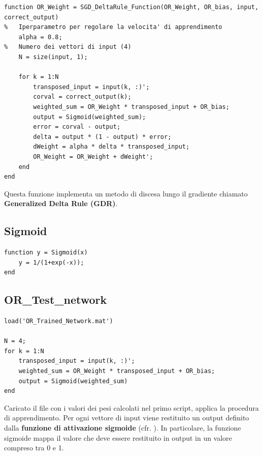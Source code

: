 \documentclass[a4paper,11pt]{article}
\begin{document}
\begin{lstlisting}[style=Matlab-editor,title=\texttt{SGD\_DeltaRule\_Function.mat}]
function OR_Weight = SGD_DeltaRule_Function(OR_Weight, OR_bias, input, correct_output)
%   Iperparametro per regolare la velocita' di apprendimento
    alpha = 0.8;
%   Numero dei vettori di input (4)
    N = size(input, 1);

    for k = 1:N 
        transposed_input = input(k, :)';
        corval = correct_output(k);
        weighted_sum = OR_Weight * transposed_input + OR_bias;
        output = Sigmoid(weighted_sum);
        error = corval - output;
        delta = output * (1 - output) * error;
        dWeight = alpha * delta * transposed_input;
        OR_Weight = OR_Weight + dWeight';
    end	
end
\end{lstlisting}
Questa funzione implementa un metodo di discesa lungo il gradiente chiamato \textbf{Generalized Delta Rule (GDR)}.


\subsection{Sigmoid}\label{sig}

\begin{lstlisting}[style=Matlab-editor,title=\texttt{Sigmoid.mat}]
function y = Sigmoid(x)
    y = 1/(1+exp(-x));
end
\end{lstlisting}


\subsection{OR\_Test\_network}

\begin{lstlisting}[style=Matlab-editor,title=\texttt{OR\_Test\_network.mat}]
load('OR_Trained_Network.mat')

N = 4;
for k = 1:N
    transposed_input = input(k, :)';
    weighted_sum = OR_Weight * transposed_input + OR_bias;
    output = Sigmoid(weighted_sum)
end
\end{lstlisting}

Caricato il file con i valori dei pesi calcolati nel primo script, applica la procedura di apprendimento. Per ogni vettore di input viene restituito un output definito dalla \textbf{funzione di attivazione sigmoide} (cfr. ). In particolare, la funzione sigmoide mappa il valore che deve essere restituito in output in un valore compreso tra 0 e 1.
\end{document}
